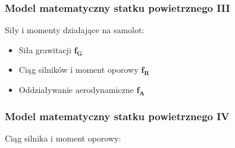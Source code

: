 \documentclass[aspectratio=169]{beamer}
\begin{document}
\begin{frame}%
	\frametitle{Model matematyczny statku powietrznego III}
	Siły i momenty działające na samolot:
			 \begin{itemize}
			  \item<2-> {
			    Siła grawitacji  $\bm{f_G}$
			  }
			  \item<3-> {   
			    Ciąg silników i moment oporowy  $\bm{f_R}$
			   }
		
			    \item<4-> {   
			    Oddziaływanie aerodynamiczne $\bm{f_A}$
			   }
			\end{itemize}
\end{frame}

\begin{frame}%
	\frametitle{Model matematyczny statku powietrznego IV}
	Ciąg silnika i moment oporowy:
	\begin{columns}[T]
		\begin{column}{0.5\textwidth}
	   	 	\begin{figure}
	   		 \centering
	    		\end{figure}
		\end{column}
		\begin{column}{0.5\textwidth}
			 \uncover<4->{ 
	      		 \[
	      		 	T \frac{d\omega}{dt} + \omega = \omega_{ZADANA}
	      		 \]}
	   	 	\begin{figure}
	   		 \centering
	    		\end{figure}
		\end{column}
	\end{columns}
\end{frame}
\end{document}

